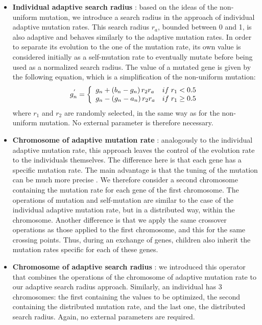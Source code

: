 \documentclass[twocol]{ametsoc}
\begin{document}
\begin{itemize}
	\item \textbf{Individual adaptive search radius} \citep{Horton2012a}: based on the ideas of the non-uniform mutation, we introduce a search radius in the approach of individual adaptive mutation rates. This search radius $r_{a}$, bounded between 0 and 1, is also adaptive and behaves similarly to the adaptive mutation rates. In order to separate its evolution to the one of the mutation rate, its own value is considered initially as a self-mutation rate to eventually mutate before being used as a normalized search radius. The value of a mutated gene is given by the following equation, which is a simplification of the non-uniform mutation:
	\begin{equation}
	g_{n}^{'} = 
	\left\lbrace \begin{array}{l l} 
	g_{n} + \left(b_{n}-g_{n}\right) r_{2} r_{a} & if \; r_{1} < 0.5 \\
	g_{n} - \left(g_{n}-a_{n}\right) r_{2} r_{a} & if \; r_{1} \geq 0.5 \\
	\end{array} \right.
	\label{equation_mutation_rayon_adaptatif}
	\end{equation}
	where $r_{1}$ and $r_{2}$ are randomly selected, in the same way as for the non-uniform mutation. No external parameter is therefore necessary.
	
	\item \textbf{Chromosome of adaptive mutation rate} \citep[\textit{n adaptative mutation rate},][]{Back1992a}: analogously to the individual adaptive mutation rate, this approach leaves the control of the evolution rate to the individuals themselves. The difference here is that each gene has a specific mutation rate. The main advantage is that the tuning of the mutation can be much more precise \citep{Smith1997a}. We therefore consider a second chromosome containing the mutation rate for each gene of the first chromosome. The operations of mutation and self-mutation are similar to the case of the individual adaptive mutation rate, but in a distributed way, within the chromosome. Another difference is that we apply the same crossover operations as those applied to the first chromosome, and this for the same crossing points. Thus, during an exchange of genes, children also inherit the mutation rates specific for each of these genes.
	
	\item \textbf{Chromosome of adaptive search radius} \citep{Horton2012a}: we introduced this operator that combines the operations of the chromosome of adaptive mutation rate to our adaptive search radius approach. Similarly, an individual has 3 chromosomes: the first containing the values to be optimized, the second containing the distributed mutation rate, and the last one, the distributed search radius. Again, no external parameters are required.
	 

\end{itemize}
\end{document}

